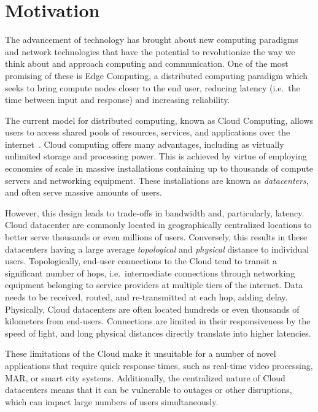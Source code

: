 \section{Motivation}

The advancement of technology has brought about new computing paradigms and network technologies that have the potential to revolutionize the way we think about and approach computing and communication.
One of the most promising of these is Edge Computing, a distributed computing paradigm which seeks to bring compute nodes closer to the end user, reducing latency (i.e.\ the time between input and response) and increasing reliability.

The current model for distributed computing, known as Cloud Computing, allows users to access shared pools of resources, services, and applications over the internet~\cite{gai2012towards}.
Cloud computing offers many advantages, including as virtually unlimited storage and processing power.
This is achieved by virtue of employing economies of scale in massive installations containing up to thousands of compute servers and networking equipment.
These installations are known as \emph{datacenters}, and often serve massive amounts of users.

However, this design leads to trade-offs in bandwidth and, particularly, latency.
Cloud datacenter are commonly located in geographically centralized locations to better serve thousands or even millions of users.
Conversely, this results in these datacenters having a large average \emph{topological} and \emph{physical} distance to individual users.
Topologically, end-user connections to the Cloud tend to transit a significant number of hops, i.e.\ intermediate connections through networking equipment belonging to service providers at multiple tiers of the internet.
Data needs to be received, routed, and re-transmitted at each hop, adding delay.
Physically, Cloud datacenters are often located hundreds or even thousands of kilometers from end-users.
Connections are limited in their responsiveness by the speed of light, and long physical distances directly translate into higher latencies.

These limitations of the Cloud make it unsuitable for a number of novel applications that require quick response times, such as real-time video processing, \gls{MAR}, or smart city systems.
Additionally, the centralized nature of Cloud datacenters means that it can be vulnerable to outages or other disruptions, which can impact large numbers of users simultaneously.


